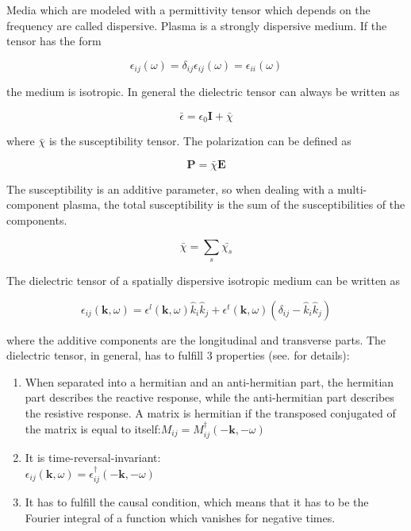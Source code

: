 \documentclass[two-column,ras]{agutex}
\begin{document}
\begin{article}
Media which are modeled with a permittivity tensor which depends on the frequency are called dispersive. Plasma is a strongly dispersive medium. If the tensor has the form

\begin{equation}
    \epsilon_{ij}(\omega)=\delta_{ij} \epsilon_{ij}(\omega)=\epsilon_{ii}(\omega)
\end{equation}

the medium is isotropic. In general the dielectric tensor can always be written as

\begin{equation}
    \bar{\epsilon}=\epsilon_0\mathbf{I}+\bar{\chi}
\end{equation}

where $\bar{\chi}$ is the susceptibility tensor. The polarization can be defined as

\begin{equation}
    \mathbf{P}=\bar{\chi} \mathbf{E}
\end{equation}

The susceptibility is an additive parameter, so when dealing with a multi-component plasma, the total susceptibility is the sum of the susceptibilities of the components.

\begin{equation}
    \bar{\chi}=\sum_s \bar{\chi_s}
\end{equation}


The dielectric tensor of a spatially dispersive isotropic medium can be written as

\begin{equation}
   \epsilon_{ij}(\mathbf{k},\omega)=\epsilon^l(\mathbf{k},\omega)\hat{k}_i \hat{k}_j+\epsilon^t(\mathbf{k},\omega)(\delta_{ij}-\hat{k}_i \hat{k}_j)
\end{equation}

where the additive components are the longitudinal and transverse parts. The dielectric tensor, in general, has to fulfill 3 properties (see. \cite{melrose1} for details):\\

\begin{enumerate}
    \item When separated into a hermitian and an anti-hermitian part, the hermitian part describes the reactive response, while the anti-hermitian part describes the resistive response. A matrix is hermitian if the transposed conjugated of the matrix is equal to itself:$M_{ij}=M_{ij}^\dagger (-\mathbf{k},-\omega)$\\
\item It is time-reversal-invariant:\\ $\epsilon_{ij}(\mathbf{k},\omega)=\epsilon_{ij}^\dagger (-\mathbf{k},-\omega)$\\
\item It has to fulfill the causal condition, which means that it has to be the Fourier integral of a function which vanishes for negative times.\\
\end{enumerate}


\end{article}
\end{document}
